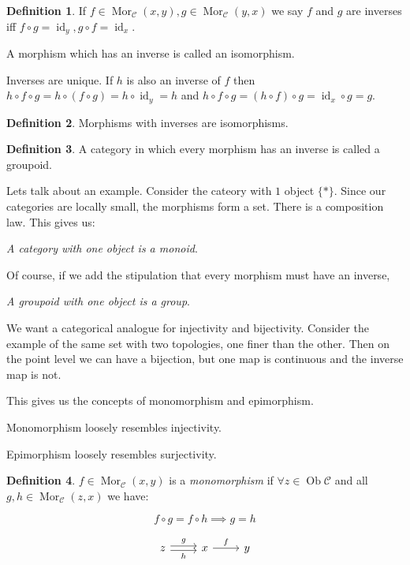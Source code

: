\documentclass{article}
\theoremstyle{definition}
\newtheorem*{definition}{Definition}
\begin{document}
    
    \begin{definition}
        If \(f\in \operatorname{Mor}_{\mathcal{C}}(x,y), g\in \operatorname{Mor}_{\mathcal{C}}(y,x)\) we say \(f\) and \(g\) are inverses iff \(f \circ g = \operatorname{id}_{y}, g \circ f = \operatorname{id}_{x}\).

        A morphism which has an inverse is called an isomorphism.
    \end{definition}
    
    Inverses are unique. If \(h\) is also an inverse of \(f\) then \(h \circ f \circ g = h \circ (f \circ g) = h \circ \operatorname{id}_{y} = h\) and \(h \circ f \circ  g= (h \circ f) \circ  g = \operatorname{id}_{x} \circ  g = g\).

    \begin{definition}
        Morphisms with inverses are isomorphisms.
    \end{definition}

    \begin{definition}
        A category in which every morphism has an inverse is called a groupoid.
    \end{definition}

    Lets talk about an example. Consider the cateory with \(1\) object \(\{ \ast \}\). Since our categories are locally small, the morphisms form a set. There is a composition law. This gives us:

    \textit{A category with one object is a monoid}.

    Of course, if we add the stipulation that every morphism must have an inverse,

    \textit{A groupoid with one object is a group}.

    We want a categorical analogue for injectivity and bijectivity. Consider the example of the same set with two topologies, one finer than the other. Then on the point level we can have a bijection, but one map is continuous and the inverse map is not.

    This gives us the concepts of monomorphism and epimorphism.

    Monomorphism loosely resembles injectivity.

    Epimorphism loosely resembles surjectivity.

    \begin{definition}
        \(f \in \operatorname{Mor}_{\mathcal{C}}(x,y)\) is a \textit{monomorphism} if \(\forall z\in \operatorname{Ob} \mathcal{C}\) and all \(g,h\in \operatorname{Mor}_{\mathcal{C}}(z,x)\) we have:
        
        \[
            f \circ  g = f \circ h \implies g = h
        \]

        \[
            \begin{tikzcd}
                z \ar[r, shift left = 2pt, "g"] \ar[r, shift right = 2pt, "h"'] & x \ar[r,"f"] & y
            \end{tikzcd}
        \]
    \end{definition}
\end{document}
